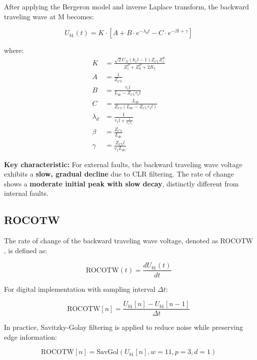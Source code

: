 \documentclass[journal]{IEEEtran}
\begin{document}
After applying the Bergeron model and inverse Laplace transform, the backward traveling wave at M becomes:

\begin{equation}
U_{b1}(t) = K \cdot \left[A + B \cdot e^{-\lambda_d t} - C \cdot e^{-\beta t + \gamma}\right]
\label{eq:external_fault_voltage}
\end{equation}

\noindent where:
\begin{align}
K &= \frac{\sqrt{2}U_N(k_1l - 1)Z_{C1}Z^P_1}{Z^P_1 + Z^P_0 + 2R_f} \\
A &= \frac{1}{Z_{C1}} \\
B &= \frac{\tau_1 l}{L_{dc} - Z_{C1}\tau_1 l} \\
C &= \frac{L_{dc}}{Z_{C1}(L_{dc} - Z_{C1}\tau_1 l)} \\
\lambda_d &= \frac{1}{\tau_1 l + \frac{1}{v_1\tau_1}} \\
\beta     &= \frac{Z_{C1}}{L_{dc}} \\
\gamma    &= \frac{Z_{C1}l}{v_1L_{dc}}
\end{align}

\textbf{Key characteristic:} For external faults, the backward traveling wave voltage exhibits a \textbf{slow, gradual decline} due to CLR filtering. The rate of change shows a \textbf{moderate initial peak with slow decay}, distinctly different from internal faults.

\subsection{ROCOTW}

The rate of change of the backward traveling wave voltage, denoted as ROCOTW \cite{sneath2016, reference_paper_frechet}, is defined as:

\begin{equation}
\text{ROCOTW}(t) = \frac{dU_{b1}(t)}{dt}
\end{equation}

For digital implementation with sampling interval $\Delta t$:

\begin{equation}
\text{ROCOTW}[n] = \frac{U_{b1}[n] - U_{b1}[n-1]}{\Delta t}
\end{equation}

In practice, Savitzky-Golay filtering is applied to reduce noise while preserving edge information:

\begin{equation}
\text{ROCOTW}[n] = \text{SavGol}\left(U_{b1}[n], w=11, p=3, d=1\right)
\end{equation}
\end{document}
